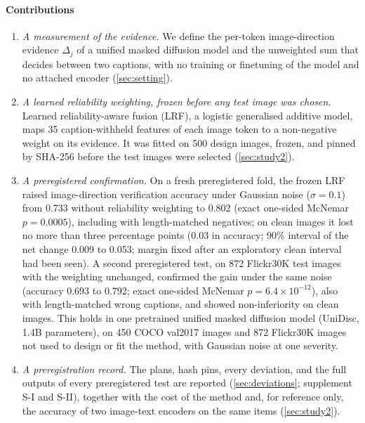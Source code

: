 \paragraph*{Contributions}
\begin{enumerate}
\item \emph{A measurement of the evidence.} We define the per-token image-direction evidence $\Delta_j$ of a unified masked diffusion
model and the unweighted sum that decides between two captions, with no training or finetuning of the model and no attached encoder
(\cref{sec:setting}).
\item \emph{A learned reliability weighting, frozen before any test image was chosen.} Learned reliability-aware fusion (LRF), a
logistic generalised additive model, maps 35 caption-withheld features of each image token to a non-negative weight on its evidence.
It was fitted on 500 design images, frozen, and pinned by SHA-256 before the test images were selected (\cref{sec:study2}).
\item \emph{A preregistered confirmation.}
On a fresh preregistered fold, the frozen LRF raised image-direction verification accuracy under Gaussian noise ($\sigma=0.1$) from 0.733
without reliability weighting to 0.802 (exact one-sided McNemar $p=0.0005$), including with length-matched negatives; on clean images it
lost no more than three percentage points (0.03 in accuracy; 90\% interval of the net change 0.009 to 0.053; margin fixed after an
exploratory clean interval had been seen).
A second preregistered test, on 872 Flickr30K test images with the weighting unchanged, confirmed the gain under the same noise (accuracy 0.693
to 0.792; exact one-sided McNemar $p=6.4\times10^{-12}$), also with length-matched wrong captions, and showed non-inferiority on clean images.
This holds in one pretrained unified masked diffusion model (UniDisc, 1.4B parameters), on 450 COCO val2017 images and 872 Flickr30K images
not used to design or fit the method, with Gaussian noise at one severity.
\item \emph{A preregistration record.} The plans, hash pins, every deviation, and the full outputs of every preregistered test are
reported (\cref{sec:deviations}; supplement S-I and S-II), together with the cost of the method and, for reference only, the accuracy of
two image-text encoders on the same items (\cref{sec:study2}).
\end{enumerate}

